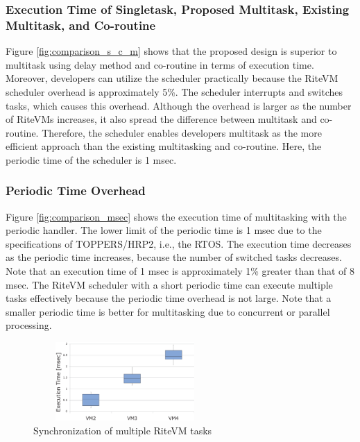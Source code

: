 \documentclass[conference]{IEEEtran/IEEEtran/IEEEtran}
\begin{document}
\subsubsection{Execution Time of Singletask, Proposed Multitask, Existing Multitask, and Co-routine}
Figure \ref{fig:comparison_s_c_m} shows that the proposed design is superior to multitask using delay method and co-routine in terms of execution time.
Moreover, developers can utilize the scheduler practically because the RiteVM scheduler overhead is approximately 5\%.
The scheduler interrupts and switches tasks, which causes this overhead.
Although the overhead is larger as the number of RiteVMs increases, it also spread the difference between multitask and co-routine.
Therefore, the scheduler enables developers multitask as the more efficient approach than the existing multitasking and co-routine.
Here, the periodic time of the scheduler is 1 msec.

\subsubsection{Periodic Time Overhead}
Figure \ref{fig:comparison_msec} shows the execution time of multitasking with the periodic handler.
The lower limit of the periodic time is 1 msec due to the specifications of TOPPERS/HRP2, i.e., the RTOS.
The execution time decreases as the periodic time increases, because the number of switched tasks decreases.
Note that an execution time of 1 msec is approximately 1\% greater than that of 8 msec.
The RiteVM scheduler with a short periodic time can execute multiple tasks effectively because the periodic time overhead is not large.
Note that a smaller periodic time is better for multitasking due to concurrent or parallel processing.

 \begin{figure}[t]
    \centering
    \includegraphics[height=3.0cm,width=7.0cm,clip]{figure/eval_synchronization.eps}
    \vspace{-3mm}
\caption{Synchronization of multiple RiteVM tasks}
    \vspace{-3mm}
\label{fig:eval_synchronization}
\end{figure}
\end{document}
